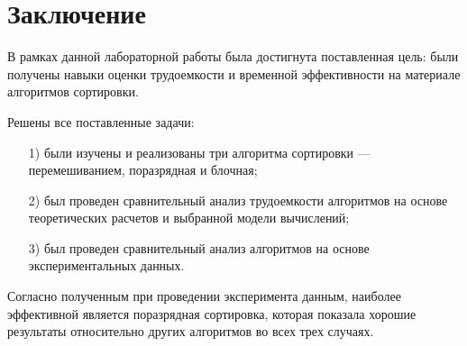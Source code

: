 {\center\chapter*{Заключение}}

В рамках данной лабораторной работы была достигнута поставленная цель: были получены навыки оценки трудоемкости и временной эффективности на материале алгоритмов сортировки.

Решены все поставленные задачи:

\begin{enumerate}
\item[1)]
были изучены и реализованы три алгоритма сортировки --- перемешиванием, поразрядная и блочная;
\item[2)]
был проведен сравнительный анализ трудоемкости алгоритмов на основе теоретических расчетов и выбранной модели вычислений;
\item[3)]
был проведен сравнительный анализ алгоритмов на основе экспериментальных данных.
\end{enumerate}

Согласно полученным при проведении эксперимента данным, наиболее эффективной является поразрядная сортировка, которая показала хорошие результаты относительно других алгоритмов во всех трех случаях.
